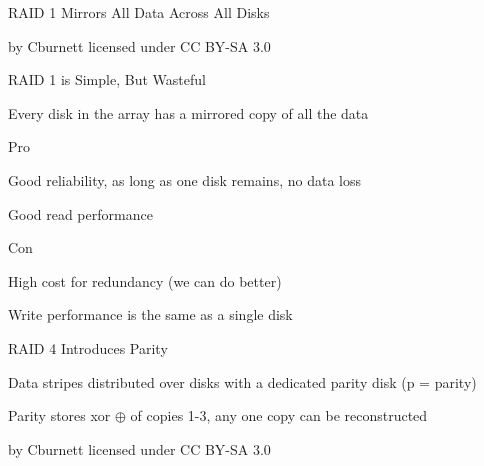   \begin{frame}{RAID 1 Mirrors All Data Across All Disks}

    \begin{center}
      
    \end{center}

    \begin{flushright}
      by Cburnett licensed under CC BY-SA 3.0
    \end{flushright}
  \end{frame}

  \begin{frame}{RAID 1 is Simple, But Wasteful}

    Every disk in the array has a mirrored copy of all the data

    \vspace{2em}

    Pro

    \hspace{2em} Good reliability, as long as one disk remains, no data loss

    \hspace{2em} Good read performance

    \vspace{2em}

    Con

    \hspace{2em} High cost for redundancy (we can do better)

    \hspace{2em} Write performance is the same as a single disk
  \end{frame}

  \begin{frame}{RAID 4 Introduces Parity}

    Data stripes distributed over disks with a dedicated parity disk (p = parity)

    \hspace{2em} Parity stores xor $\oplus$ of copies 1-3, any one copy can be
                 reconstructed

    \begin{center}
      
    \end{center}

    \begin{flushright}
      by Cburnett licensed under CC BY-SA 3.0
    \end{flushright}
  \end{frame}

